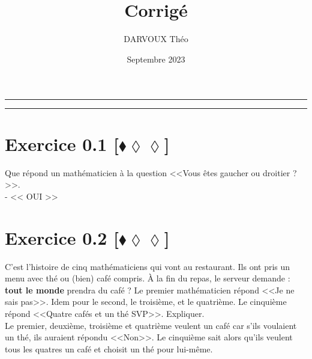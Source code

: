\documentclass[10pt]{article}
\title{\bf{\pagetitle}\\\large{Corrigé}}
\date{Septembre 2023}
\author{DARVOUX Théo}
\def\pagetitle{Logique}
\begin{document}
\renewcommand*\contentsname{Exercices.}
\renewcommand*{\cftsecleader}{\cftdotfill{\cftdotsep}}
\maketitle
\hrule
\tableofcontents
\vspace{0.5cm}
\hrule

\thispagestyle{fancy}
\fancyhead[C]{\pagetitle}



\section*{Exercice 0.1 [$\blacklozenge\lozenge\lozenge$]}
\begin{tcolorbox}[enhanced, width=6in, center, size=fbox, fontupper=\large, drop shadow southwest]
    Que répond un mathématicien à la question <<Vous êtes gaucher ou droitier ?>>.\\
    - << OUI >>
\end{tcolorbox}

\section*{Exercice 0.2 [$\blacklozenge\lozenge\lozenge$]}
\begin{tcolorbox}[enhanced, width=6in, center, size=fbox, fontupper=\large, drop shadow southwest]
    C'est l'histoire de cinq mathématiciens qui vont au restaurant. Ils ont pris un menu avec thé ou (bien) café compris. À la fin du repas, le serveur demande : \textbf{tout le monde} prendra du café ? Le premier mathématicien répond <<Je ne sais pas>>. Idem pour le second, le troisième, et le quatrième. Le cinquième répond <<Quatre cafés et un thé SVP>>. Expliquer.\\[0.5cm]
    Le premier, deuxième, troisième et quatrième veulent un café car s'ils voulaient un thé, ils auraient répondu <<Non>>. Le cinquième sait alors qu'ils veulent tous les quatres un café et choisit un thé pour lui-même. 
\end{tcolorbox}
\end{document}
